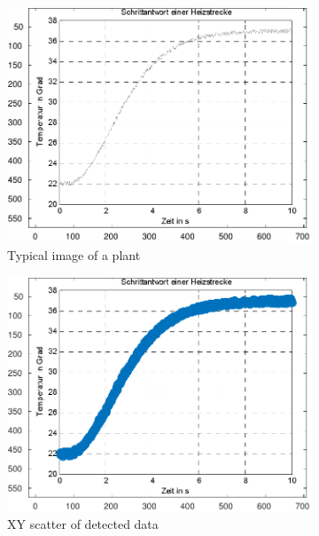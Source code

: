 \begin{figure}
    \centering
    \begin{subfigure}{.5\textwidth}
        \includegraphics[width=\linewidth]{images/plant}
        \caption{Typical image of a plant}
        \label{fig:image:plant}
    \end{subfigure}
    \begin{subfigure}{.5\textwidth}
        \includegraphics[width=\linewidth]{images/scatter_raw}
        \caption{XY scatter of detected data}
        \label{fig:image:scatter_raw}
    \end{subfigure}
    \begin{subfigure}{.5\textwidth}

\end{subfigure}
\end{figure}
